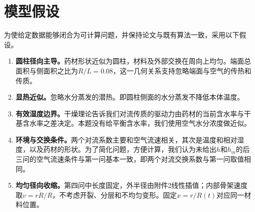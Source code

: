 \nextpage
\section{模型假设}
为使给定数据能够闭合为可计算问题，并保持论文与既有算法一致，采用以下假设。

\begin{enumerate}
\item \textbf{圆柱径向主导。}药材形状近似为圆柱，材料及外部交换在周向上均匀。端面总面积与侧面积之比为$R/L=0.08$，这一几何关系支持忽略端面与空气的传热和传质。
\item \textbf{显热近似。}忽略水分蒸发的潜热。即圆柱侧面的水分蒸发不降低本体温度。
\item \textbf{有效湿度边界。}干燥理论告诉我们对流传质的驱动力由药材的当前含水率与干基含水率之差决定。本题没有给平衡含水率，我们使用空气水分浓度做近似。
\item \textbf{环境与交换条件。}两个对流系数主要和空气流速相关，其次是温度和相对湿度，以及药材的形状。为了简化问题，方便计算，我们认为未给出$h$和$h_m$的后三问的空气流速条件与第一问基本一致，即两个对流交换系数与第一问取值相同。
\item \textbf{均匀径向收缩。}第四问中长度固定，外半径由附件2线性插值；内部骨架速度取$v=r\dot R/R$，不考虑开裂、分层和不均匀变形。固定$x=r/R(t)$对应同一材料位置。
\end{enumerate}

\nextpage
